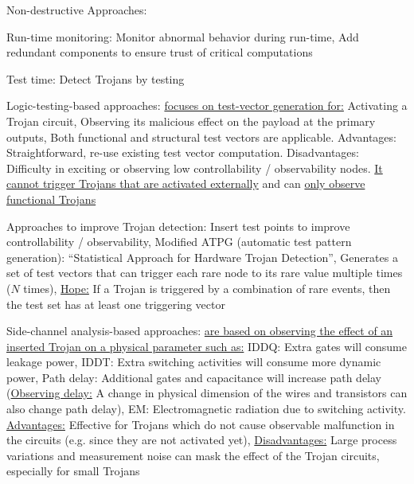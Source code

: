 \documentclass[landscape, a4paper]{article}
\begin{document}
\begin{minipage}[t]{0.2\linewidth}
\begin{betterlist}
\begin{betterlist}
\begin{betterlist}
				\item \alert{Non-destructive Approaches:}
				\begin{betterlist}
					\item \alert{Run-time monitoring:} Monitor abnormal behavior during run-time, Add redundant components to ensure trust of critical computations
					\item \alert{Test time:} Detect Trojans by testing
					\begin{betterlist}
						\item \alert{Logic-testing-based approaches:} \underline{focuses on test-vector generation for:} Activating a Trojan circuit, Observing its malicious effect on the payload at the primary outputs, Both functional and structural test vectors are applicable. \alert{Advantages:} Straightforward, re-use existing test vector computation. \alert{Disadvantages:} Difficulty in exciting or observing low controllability / observability nodes. \underline{It cannot trigger Trojans that are activated externally} and can \underline{only observe functional Trojans}
						\begin{betterlist}
							\item \alert{Approaches to improve Trojan detection:} Insert \alert{test points} to improve controllability / observability, \alert{Modified ATPG} (automatic test pattern generation): \enquote{Statistical Approach for Hardware Trojan Detection}, Generates a set of test vectors that can trigger each rare node to its rare value multiple times ($N$ times), \underline{Hope:} If a Trojan is triggered by a combination of rare events, then the test set has at least one triggering vector%
						\end{betterlist}
						\item \alert{Side-channel analysis-based approaches:} \uline{are based on observing the effect of an inserted Trojan on a physical parameter such as:} \alert{IDDQ:} Extra gates will consume leakage power, \alert{IDDT:} Extra switching activities will consume more dynamic power, \alert{Path delay:} Additional gates and capacitance will increase path delay (\underline{Observing delay:} A change in physical dimension of the wires and transistors can also change path delay), \alert{EM:} Electromagnetic radiation due to switching activity. \underline{Advantages:} Effective for Trojans which do not cause observable malfunction in the circuits (e.g. since they are not activated yet), \underline{Disadvantages:} Large process variations and measurement noise can mask the effect of the Trojan circuits, especially for small Trojans

\end{betterlist}
\end{betterlist}
\end{betterlist}
\end{betterlist}
\end{betterlist}
\end{minipage}
\end{document}
